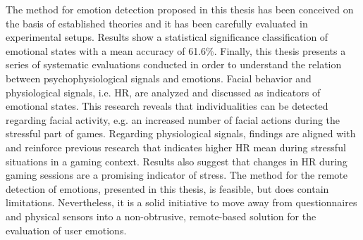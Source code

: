 The method for emotion detection proposed in this thesis has been conceived on the basis of established theories and it has been carefully evaluated in experimental setups. Results show a statistical significance classification of emotional states with a mean accuracy of 61.6\%. Finally, this thesis presents a series of systematic evaluations conducted in order to understand the relation between psychophysiological signals and emotions. Facial behavior and physiological signals, i.e. HR, are analyzed and discussed as indicators of emotional states. This research reveals that individualities can be detected regarding facial activity, e.g. an increased number of facial actions during the stressful part of games. Regarding physiological signals, findings are aligned with and reinforce previous research that indicates higher HR mean during stressful situations in a gaming context. Results also suggest that changes in HR during gaming sessions are a promising indicator of stress. The method for the remote detection of emotions, presented in this thesis, is feasible, but does contain limitations. Nevertheless, it is a solid initiative to move away from questionnaires and physical sensors into a non-obtrusive, remote-based solution for the evaluation of user emotions.
